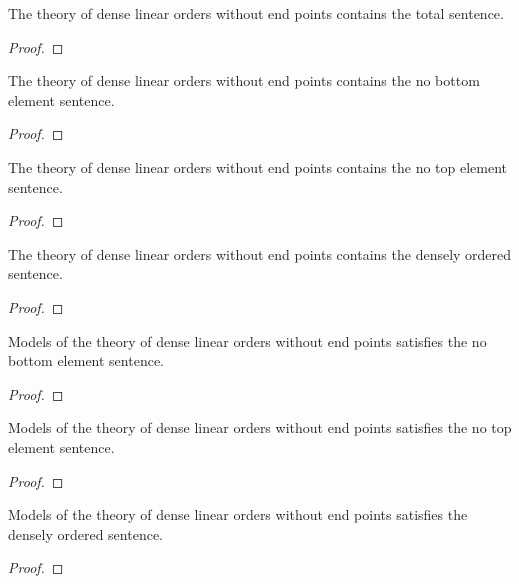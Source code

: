 \begin{lemma}
    \label{lem:total_mem_dlo}
    \leanok
    The theory of dense linear orders without end points contains the total sentence.
\end{lemma}
\begin{proof}
    \leanok
\end{proof}

\begin{lemma}
    \label{lem:noBotOrder_mem_dlo}
    \leanok
    The theory of dense linear orders without end points contains the no bottom element sentence.
\end{lemma}
\begin{proof}
    \leanok
\end{proof}

\begin{lemma}
    \label{lem:noTopOrder_mem_dlo}
    \leanok
    The theory of dense linear orders without end points contains the no top element sentence.
\end{lemma}
\begin{proof}
    \leanok
\end{proof}

\begin{lemma}
    \label{lem:denselyOrdered_mem_dlo}
    \leanok
    The theory of dense linear orders without end points contains the densely ordered sentence.
\end{lemma}
\begin{proof}
    \leanok
\end{proof}

\begin{lemma}
    \label{lem:realize_noBot}
    \leanok
    Models of the theory of dense linear orders without end points satisfies the no bottom element sentence.
\end{lemma}
\begin{proof}
    \leanok
\end{proof}

\begin{lemma}
    \label{lem:realize_noTop}
    \leanok
    Models of the theory of dense linear orders without end points satisfies the no top element sentence.
\end{lemma}
\begin{proof}
    \leanok
\end{proof}

\begin{lemma}
    \label{lem:realize_denselyOrdered}
    \leanok
    Models of the theory of dense linear orders without end points satisfies the densely ordered sentence.
\end{lemma}
\begin{proof}
    \leanok
\end{proof}



